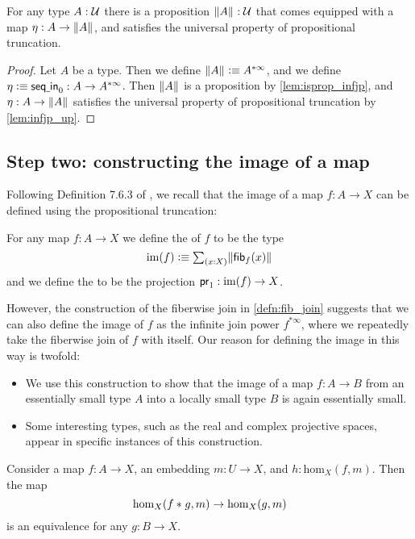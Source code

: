 \begin{thm}
For any type $A:\mathcal{U}$ there is a proposition $\Vert A\Vert_{}:\mathcal{U}$ that comes equipped with a map $\eta:A\to \Vert A\Vert_{}$, and satisfies the universal property of propositional truncation.
\end{thm}

\begin{proof}
Let $A$ be a type. Then we define $\Vert A\Vert_{}\vcentcolon\equiv A^{\ast\infty}$, and we define $\eta\vcentcolon\equiv \mathsf{seq\underline{\ }{}in}_0:A\to A^{\ast\infty}$. Then $\Vert A\Vert_{}$ is a proposition by \cref{lem:isprop_infjp}, and $\eta:A\to \Vert A\Vert_{}$ satisfies the universal property of propositional truncation by \cref{lem:infjp_up}.
\end{proof}

\subsection{Step two: constructing the image of a map}\label{sec:join_stage2}
Following Definition 7.6.3 of \cite{hottbook}, we recall that the image of a map $f:A\to X$ can be defined using the propositional truncation:
\begin{defn}
For any map $f:A\to X$ we define the  of $f$ to be the type
\begin{equation*}
\im(f) \defeq \sm{x:X}\brck{\fib{f}{x}}
\end{equation*}
and we define the  to be the projection $\mathsf{pr}_{1} :\operatorname{im}(f)\to X$. 
\end{defn}
However, the construction of the fiberwise join in \cref{defn:fib_join} suggests that we can also define the image of $f$ as the infinite join power $f^{\ast\infty}$, where we repeatedly take the fiberwise join of $f$ with itself. Our reason for defining the image in this way is twofold: 
\begin{itemize}
\item We use this construction to show that the image of a map $f:A\to B$ from an essentially small type $A$ into a locally small type $B$ is again essentially small.
\item Some interesting types, such as the real and complex projective spaces, appear in specific instances of this construction.
\end{itemize}

\begin{lem}
Consider a map $f:A\to X$, an embedding $m:U\to X$, and $h:\mathrm{hom}_X(f,m)$. Then the map
\begin{equation*}
\mathrm{hom}_X({f}\ast_{}{g},m)\to \mathrm{hom}_X(g,m)
\end{equation*}
is an equivalence for any $g:B\to X$.
\end{lem}

